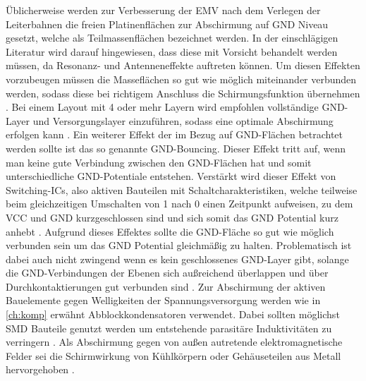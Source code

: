 Üblicherweise werden zur Verbesserung der EMV nach dem Verlegen der Leiterbahnen die freien Platinenflächen zur Abschirmung auf GND Niveau gesetzt, welche als Teilmassenflächen bezeichnet werden. In der einschlägigen Literatur wird darauf hingewiesen, dass diese mit Vorsicht behandelt werden müssen, da Resonanz- und Antenneneffekte auftreten können. Um diesen Effekten vorzubeugen müssen die Masseflächen so gut wie möglich miteinander verbunden werden, sodass diese bei richtigem Anschluss die Schirmungsfunktion übernehmen \cite[S.166]{Franz2012}. Bei einem Layout mit 4 oder mehr Layern wird empfohlen vollständige GND-Layer und Versorgungslayer einzuführen, sodass eine optimale Abschirmung erfolgen kann \cite[S.172]{Franz2012}. Ein weiterer Effekt der im Bezug auf GND-Flächen betrachtet werden sollte ist das so genannte GND-Bouncing. Dieser Effekt tritt auf, wenn man keine gute Verbindung zwischen den GND-Flächen hat und somit unterschiedliche GND-Potentiale entstehen. Verstärkt wird dieser Effekt von Switching-ICs, also aktiven Bauteilen mit Schaltcharakteristiken, welche teilweise beim gleichzeitigen Umschalten von 1 nach 0 einen Zeitpunkt aufweisen, zu dem VCC und GND kurzgeschlossen sind und sich somit das GND Potential kurz anhebt \cite[S.1]{gndbnc}. Aufgrund dieses Effektes sollte die GND-Fläche so gut wie möglich verbunden sein um das GND Potential gleichmäßig zu halten. Problematisch ist dabei auch nicht zwingend wenn es kein geschlossenes GND-Layer gibt, solange die GND-Verbindungen der Ebenen sich außreichend überlappen und über Durchkontaktierungen gut verbunden sind \cite[S.172]{Franz2012}. Zur Abschirmung der aktiven Bauelemente gegen Welligkeiten der Spannungsversorgung werden wie in \autoref{ch:komp} erwähnt Abblockkondensatoren verwendet. Dabei sollten möglichst SMD Bauteile genutzt werden um entstehende parasitäre Induktivitäten zu verringern \cite[S.34]{emcdes}. Als Abschirmung gegen von außen autretende elektromagnetische Felder sei die Schirmwirkung von Kühlkörpern oder Gehäuseteilen aus Metall hervorgehoben \cite[S.22]{Franz2012}.


